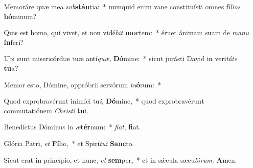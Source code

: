 \item Memoráre quæ mea \textit{sub}\textbf{stán}tia:~* numquid enim vane constituísti omnes fí\textit{li}\textit{os} \textbf{hó}minum?
\item Quis est homo, qui vivet, et non vidé\textit{bit} \textbf{mor}tem:~* éruet ánimam suam de \textit{ma}\textit{nu} \textbf{ín}feri?
\item Ubi sunt misericórdiæ tuæ antí\textit{quæ}, \textbf{Dó}mine:~* sicut jurásti David in veri\textit{tá}\textit{te} \textbf{tu}a?
\item Memor esto, Dómine, oppróbrii servórum \textit{tu}\textbf{ó}rum:~* 
\item Quod exprobravérunt inimíci tu\textit{i}, \textbf{Dó}mine,~* quod exprobravérunt commutatiónem \textit{Chris}\textit{ti} \textbf{tu}i.
\item Benedíctus Dóminus in \textit{æ}\textbf{tér}num:~* \textit{fi}\textit{at}, \textbf{fi}at.
\item Glória Patri, \textit{et} \textbf{Fí}lio,~* et Spirí\textit{tu}\textit{i} \textbf{Sanc}to.
\item Sicut erat in princípio, et nunc, \textit{et} \textbf{sem}per,~* et in sǽcula sæcu\textit{ló}\textit{rum}. \textbf{A}men.
